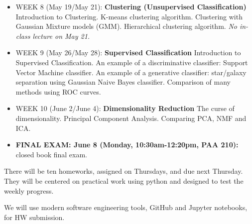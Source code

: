 \documentclass[10pt]{article}
\begin{document}
\begin{itemize}
\item WEEK 8 (May 19/May 21): {\bf Clustering (Unsupervised Classification)}
Introduction to Clustering. 
K-means clustering algorithm.
Clustering with Gaussian Mixture models (GMM).
Hierarchical clustering algorithm. {\it No in-class lecture on May 21.}


\item WEEK 9 (May 26/May 28): {\bf Supervised Classification}
Introduction to Supervised Classification.
An example of a discriminative classifier: Support Vector Machine classifier.
An example of a generative classifier: star/galaxy separation using Gaussian Naive Bayes classifier.
Comparison of many methods using ROC curves.

 \item WEEK 10 (June 2/June 4): {\bf Dimensionality Reduction}
The curse of dimensionality.
Principal Component Analysis.
Comparing PCA, NMF and ICA. 

\item {\bf FINAL EXAM: June 8 (Monday, 10:30am-12:20pm, PAA 210):} closed book final exam.

\end{itemize}


\vskip 0.2in


There will be ten homeworks, assigned on Thursdays, and due next Thursday. They will
be centered on practical work using python and designed to test the weekly progress. 

We will use modern software engineering tools, GitHub and Jupyter notebooks, for HW submission. 
\end{document}
